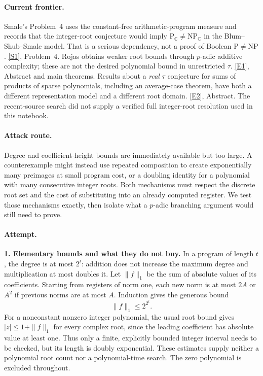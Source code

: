 \documentclass[11pt,a4paper]{article}
\newcommand{\C}{\mathbb{C}}
\newcommand{\sref}[2]{\hyperlink{source:#1:#2}{[S#2]}}
\newcommand{\eref}[2]{\hyperlink{extra:#1:#2}{[E#2]}}
\numberwithin{equation}{section}
\begin{document}
\paragraph{Current frontier.}
Smale's Problem~4 uses the constant-free arithmetic-program measure and
records that the integer-root conjecture would imply
$\mathrm P_{\C}\ne\mathrm{NP}_{\C}$ in the Blum--Shub--Smale model.
That is a serious dependency, not a proof of Boolean $\mathrm P\ne
\mathrm{NP}$. \sref{224}{1}, Problem~4.
Rojas obtains weaker root bounds through $p$-adic additive complexity;
these are not the desired polynomial bound in unrestricted $\tau$.
\eref{224}{1}, Abstract and main theorems. Results about a \emph{real}
$\tau$ conjecture for sums of products of sparse polynomials, including
an average-case theorem, have both a different representation model and
a different root domain. \eref{224}{2}, Abstract.
The recent-source search did not supply a verified full integer-root
resolution used in this notebook.

\paragraph{Attack route.}
Degree and coefficient-height bounds are immediately available but too
large. A counterexample might instead use repeated composition to create
exponentially many preimages at small program cost, or a doubling identity
for a polynomial with many consecutive integer roots. Both mechanisms
must respect the discrete root set and the cost of substituting into an
already computed register. We test those mechanisms exactly, then isolate
what a $p$-adic branching argument would still need to prove.

\paragraph{Attempt.}
\textbf{1. Elementary bounds and what they do not buy.}
In a program of length $t$, the degree is at most $2^t$: addition does
not increase the maximum degree and multiplication at most doubles it.
Let $\|f\|_1$ be the sum of absolute values of its coefficients. Starting
from registers of norm one, each new norm is at most $2A$ or $A^2$ if
previous norms are at most $A$. Induction gives the generous bound
\[
 \|f\|_1\le 2^{2^t}.
\]
For a nonconstant nonzero integer polynomial, the usual root bound gives
$|z|\le1+\|f\|_1$ for every complex root, since the leading coefficient
has absolute value at least one. Thus only a finite, explicitly bounded
integer interval needs to be checked, but its length is doubly
exponential. These estimates supply neither a polynomial root count nor
a polynomial-time search. The zero polynomial is excluded throughout.
\end{document}
